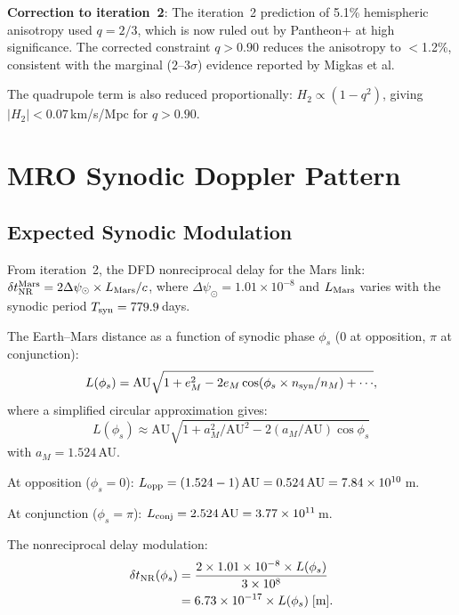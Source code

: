 \documentclass[aps,prd,twocolumn,superscriptaddress]{revtex4-2}
\begin{document}
\textbf{Correction to iteration~2}: The iteration~2 prediction
of 5.1\% hemispheric anisotropy used $q = 2/3$, which is now
ruled out by Pantheon+ at high significance. The corrected constraint
$q > 0.90$ reduces the anisotropy to $<$1.2\%, consistent with
the marginal ($2$--$3\sigma$) evidence reported by Migkas et al.

The quadrupole term is also reduced proportionally: $H_2 \propto
(1-q^2)$, giving $|H_2| < 0.07$\,km/s/Mpc for $q > 0.90$.


\section{MRO Synodic Doppler Pattern}
\label{sec:MRO-Doppler}

\subsection{Expected Synodic Modulation}

From iteration~2, the DFD nonreciprocal delay for the Mars link:
$\delta t_{\rm NR}^{\rm Mars} = 2\Delta\psi_\odot\times L_{\rm Mars}/c$,
where $\Delta\psi_\odot = 1.01\times10^{-8}$ and
$L_{\rm Mars}$ varies with the synodic period $T_{\rm syn} = 779.9$\,days.

The Earth--Mars distance as a function of synodic phase $\phi_s$
(0 at opposition, $\pi$ at conjunction):
\begin{equation}
L(\phi_s) = \text{AU}\sqrt{1 + e_M^2 - 2e_M\cos(\phi_s\times n_{\rm syn}/n_M)
+ \cdots},
\end{equation}
where a simplified circular approximation gives:
\begin{equation}
L(\phi_s) \approx \text{AU}\sqrt{1 + a_M^2/\text{AU}^2 - 2(a_M/\text{AU})\cos\phi_s}
\end{equation}
with $a_M = 1.524$\,AU.

At opposition ($\phi_s = 0$): $L_{\rm opp} = (1.524 - 1)\,\text{AU}
= 0.524\,\text{AU} = 7.84\times10^{10}$\,m.

At conjunction ($\phi_s = \pi$): $L_{\rm conj} = 2.524\,\text{AU}
= 3.77\times10^{11}$\,m.

The nonreciprocal delay modulation:
\begin{align}
\delta t_{\rm NR}(\phi_s) &= \frac{2\times1.01\times10^{-8}
\times L(\phi_s)}{3\times10^8}
\nonumber\\
&= 6.73\times10^{-17}\times L(\phi_s)\;[\text{m}].
\end{align}
\end{document}
